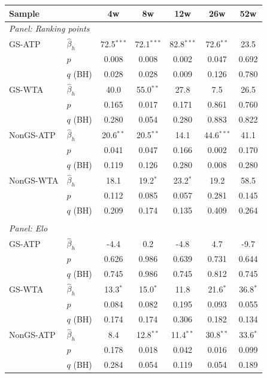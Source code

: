 \begin{tabular}{ll*{5}{c}}
\toprule
Sample & & 4w & 8w & 12w & 26w & 52w \\
\midrule
\multicolumn{7}{l}{\textit{Panel: Ranking points}} \\ \midrule
GS-ATP & $\hat{\beta}_h$ & 72.5$^{***}$ & 72.1$^{***}$ & 82.8$^{***}$ & 72.6$^{**}$ & 23.5 \\
 & $p$ & 0.008 & 0.008 & 0.002 & 0.047 & 0.692 \\
 & $q$ (BH) & 0.028 & 0.028 & 0.009 & 0.126 & 0.780 \\[0.2em]
GS-WTA & $\hat{\beta}_h$ & 40.0 & 55.0$^{**}$ & 27.8 & 7.5 & 26.5 \\
 & $p$ & 0.165 & 0.017 & 0.171 & 0.861 & 0.760 \\
 & $q$ (BH) & 0.280 & 0.054 & 0.280 & 0.883 & 0.822 \\[0.2em]
NonGS-ATP & $\hat{\beta}_h$ & 20.6$^{**}$ & 20.5$^{**}$ & 14.1 & 44.6$^{***}$ & 41.1 \\
 & $p$ & 0.041 & 0.047 & 0.166 & 0.002 & 0.170 \\
 & $q$ (BH) & 0.119 & 0.126 & 0.280 & 0.008 & 0.280 \\[0.2em]
NonGS-WTA & $\hat{\beta}_h$ & 18.1 & 19.2$^{*}$ & 23.2$^{*}$ & 19.2 & 58.5 \\
 & $p$ & 0.112 & 0.085 & 0.057 & 0.281 & 0.145 \\
 & $q$ (BH) & 0.209 & 0.174 & 0.135 & 0.409 & 0.264 \\[0.2em]
\\[0.3em]
\multicolumn{7}{l}{\textit{Panel: Elo}} \\ \midrule
GS-ATP & $\hat{\beta}_h$ & -4.4 & 0.2 & -4.8 & 4.7 & -9.7 \\
 & $p$ & 0.626 & 0.986 & 0.639 & 0.731 & 0.644 \\
 & $q$ (BH) & 0.745 & 0.986 & 0.745 & 0.812 & 0.745 \\[0.2em]
GS-WTA & $\hat{\beta}_h$ & 13.3$^{*}$ & 15.0$^{*}$ & 11.8 & 21.6$^{*}$ & 36.8$^{*}$ \\
 & $p$ & 0.084 & 0.082 & 0.195 & 0.093 & 0.055 \\
 & $q$ (BH) & 0.174 & 0.174 & 0.306 & 0.182 & 0.134 \\[0.2em]
NonGS-ATP & $\hat{\beta}_h$ & 8.4 & 12.8$^{**}$ & 11.4$^{**}$ & 30.8$^{**}$ & 33.6$^{*}$ \\
 & $p$ & 0.178 & 0.018 & 0.042 & 0.016 & 0.099 \\
 & $q$ (BH) & 0.284 & 0.054 & 0.119 & 0.054 & 0.189 \\[0.2em]

\end{tabular}
